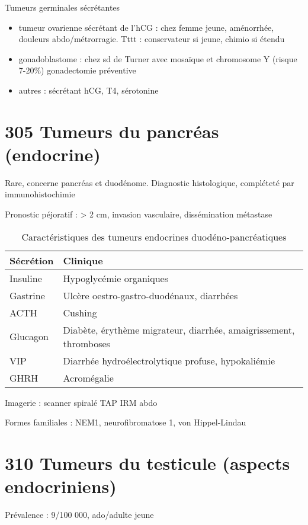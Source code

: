 \documentclass{book}
\begin{document}
Tumeurs germinales sécrétantes
\begin{itemize}
\item tumeur ovarienne sécrétant de l'hCG : chez femme jeune, aménorrhée, douleurs
abdo/métrorragie. Tttt : conservateur si jeune, chimio si étendu
\item gonadoblastome : chez sd de Turner avec mosaïque et chromosome Y (risque
7-20\%) \thus gonadectomie préventive
\item autres : sécrétant hCG, T4, sérotonine
\end{itemize}

\section{305 \textdagger{} Tumeurs du pancréas (endocrine)}
\label{sec:orgd15a82d}
Rare, concerne pancréas et duodénome. Diagnostic histologique, compléteté par
immunohistochimie

Pronostic péjoratif : > 2 cm, invasion vasculaire, dissémination métastase

\begin{table}[htbp]
\caption{Caractéristiques des tumeurs endocrines duodéno-pancréatiques}
\centering
\begin{tabular}{ll}
\toprule
Sécrétion & Clinique\\
\midrule
Insuline & Hypoglycémie organiques\\
Gastrine & Ulcère oestro-gastro-duodénaux, diarrhées\\
ACTH & Cushing\\
Glucagon & Diabète, érythème migrateur, diarrhée, amaigrissement, thromboses\\
VIP & Diarrhée hydroélectrolytique profuse, hypokaliémie\\
GHRH & Acromégalie\\
\bottomrule
\end{tabular}
\end{table}

Imagerie : scanner spiralé TAP \textpm{} IRM abdo

Formes familiales : NEM1, neurofibromatose 1, von Hippel-Lindau

\section{310 \textdagger{} Tumeurs du testicule (aspects endocriniens)}
\label{sec:org72162de}

Prévalence : 9/100 000, ado/adulte jeune
\end{document}
